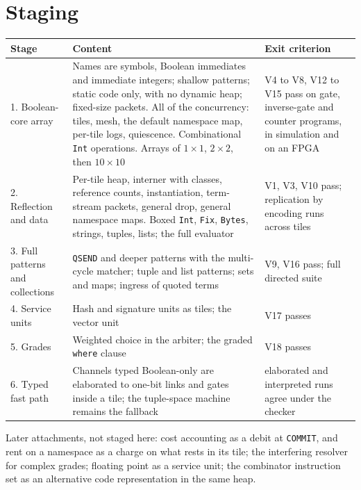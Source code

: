 \documentclass[11pt]{article}
\newcommand{\kw}[1]{\texttt{#1}}
\theoremstyle{definition}
\theoremstyle{remark}
\begin{document}
\section{Staging}\label{sec:staging}

\noindent
\begin{tabularx}{\textwidth}{@{}l X X@{}}
\toprule
Stage & Content & Exit criterion\\
\midrule
1. Boolean-core array & Names are symbols, Boolean immediates and immediate
  integers; shallow patterns; static code only, with no dynamic heap;
  fixed-size packets. All of the concurrency: tiles, mesh, the default
  namespace map, per-tile logs, quiescence. Combinational \kw{Int}
  operations. Arrays of $1 \times 1$, $2 \times 2$, then $10 \times 10$
  & V4 to V8, V12 to V15 pass on gate, inverse-gate and counter programs, in
    simulation and on an FPGA\\
2. Reflection and data & Per-tile heap, interner with classes, reference
  counts, instantiation, term-stream packets, general drop, general
  namespace maps. Boxed \kw{Int}, \kw{Fix}, \kw{Bytes}, strings, tuples,
  lists; the full evaluator
  & V1, V3, V10 pass; replication by encoding runs across tiles\\
3. Full patterns and collections & \kw{QSEND} and deeper patterns with the
  multi-cycle matcher; tuple and list patterns; sets and maps; ingress of
  quoted terms & V9, V16 pass; full directed suite\\
4. Service units & Hash and signature units as tiles; the vector unit
  & V17 passes\\
5. Grades & Weighted choice in the arbiter; the graded \kw{where} clause
  & V18 passes\\
6. Typed fast path & Channels typed Boolean-only are elaborated to one-bit
  links and gates inside a tile; the tuple-space machine remains the fallback
  & elaborated and interpreted runs agree under the checker\\
\bottomrule
\end{tabularx}

\medskip\noindent
Later attachments, not staged here: cost accounting as a debit at
\kw{COMMIT}, and rent on a namespace as a charge on what rests in its tile;
the interfering resolver for complex grades; floating point as a service
unit; the combinator instruction set as an alternative code representation
in the same heap.

\end{document}

